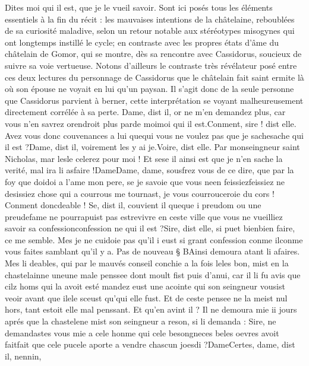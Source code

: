 \documentclass{article}
\begin{document}
\begin{pages}
   Dites moi qui il est, que je le vueil savoir.
   Sont ici posés tous les éléments essentiels à la fin du récit : les mauvaises intentions de la châtelaine,
   reboublées de sa curiosité maladive, selon un retour notable aux stéréotypes misogynes qui ont longtemps instillé le cycle; 
   en contraste avec les propres états d'âme du châtelain de Gomor, qui se montre, dès sa rencontre avec Cassidorus, 
   soucieux de suivre sa voie vertueuse. Notons d'ailleurs le contraste très révélateur posé entre ces deux lectures du personnage de Cassidorus
   que le châtelain fait saint ermite là où son épouse ne voyait en lui qu'un paysan. Il s'agit donc de la seule personne que Cassidorus
   parvient à berner, cette interprétation se voyant malheureusement directement corrélée à sa perte.
   Dame, dist il, or ne m’en demandez plus, car vous n’en savrez orendroit plus 
      parde 
      moimoi qui il est.Conment, sire ! dist elle. Avez vous donc couvenances a lui 
      quequi vous ne voulez pas que je 
      sachesache qui il est ?Dame, dist il, voirement les y ai je.Voire, dist elle. Par monseingneur saint Nicholas, mar 
      lesle celerez pour moi ! 
      Et sese il ainsi est que je n’en sache la verité, mal ira li asfaire !DameDame, dame, sousfrez vous de ce dire, 
      que par la foy que doidoi a l’ame mon pere, 
      se je savoie que vous neen 
      feissiezfeissiez ne desissiez chose qui a courrous me tournast, 
      je vous courrouceroie du cors ! Conment doncdeable ! 
      Se, dist il, couvient il queque i 
      preudom ou une preudefame ne 
      pourrapuist pas 
      estrevivre en ceste ville 
      que vous ne vueilliez savoir sa confessionconfession ne qui il est ?Sire, dist elle, si puet bienbien faire, 
      ce me semble. Mes je ne cuidoie pas qu’il i eust si grant confession 
      conme ilconme vous faites samblant qu'il y a. \pend
\pstart Pas de nouveau § BAinsi demoura atant li afaires. 
   Mes li deables, qui par le mauvés conseil conchie a la fois 
   leles bon, mist en la chastelainne 
   uneune male penssee dont moult fist puis d’anui, 
   car il li fu avis que cilz homs 
      qui la avoit esté mandez eust une acointe qui son seingneur vousist veoir avant que 
      ilele sceust qu’qui
      elle fust. 
   Et de ceste pensee ne la meist nul hors, tant estoit elle mal penssant. Et qu’en avint il ? 
   Il ne demoura mie ii jours aprés que la chastelene mist 
   son seingneur a reson, si li demanda :
   Sire, ne demandastes vous mie a cele honme qui 
      cele besongneces beles oevres avoit 
      faitfait que cele pucele aporte a vendre chascun joesdi ?DameCertes, dame, dist il, nennin, 

\end{pages}
\end{document}
